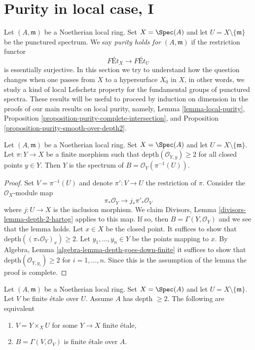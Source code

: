 \section{Purity in local case, I}
\label{section-local-purity}

\noindent
Let $(A, \mathfrak m)$ be a Noetherian local ring. Set $X = \Spec(A)$
and let $U = X \setminus \{\mathfrak m\}$ be the punctured spectrum.
We say {\it purity holds for $(A, \mathfrak m)$} if the restriction functor
$$
\textit{F\'Et}_X \longrightarrow \textit{F\'Et}_U
$$
is essentially surjective. In this section we try to understand how the
question changes when one passes from $X$ to a hypersurface $X_0$ in $X$,
in other words, we study a kind of local Lefschetz property for the
fundamental groups of punctured spectra.
These results will be useful to proceed by induction on dimension
in the proofs of our main results on local purity, namely,
Lemma \ref{lemma-local-purity},
Proposition \ref{proposition-purity-complete-intersection}, and
Proposition \ref{proposition-purity-smooth-over-depth2}.

\begin{lemma}
\label{lemma-sections-over-punctured-spec}
Let $(A, \mathfrak m)$ be a Noetherian local ring. Set $X = \Spec(A)$
and let $U = X \setminus \{\mathfrak m\}$.
Let $\pi : Y \to X$ be a finite morphism such that
$\text{depth}(\mathcal{O}_{Y, y}) \geq 2$ for all closed points
$y \in Y$.
Then $Y$ is the spectrum of $B = \mathcal{O}_Y(\pi^{-1}(U))$.
\end{lemma}

\begin{proof}
Set $V = \pi^{-1}(U)$ and denote $\pi' : V \to U$ the restriction of $\pi$.
Consider the $\mathcal{O}_X$-module map
$$
\pi_*\mathcal{O}_Y \longrightarrow j_*\pi'_*\mathcal{O}_V
$$
where $j : U \to X$ is the inclusion morphism. We claim
Divisors, Lemma \ref{divisors-lemma-depth-2-hartog}
applies to this map. If so, then $B = \Gamma(Y, \mathcal{O}_Y)$
and we see that the lemma holds. Let $x \in X$ be the closed point.
It suffices to show that
$\text{depth}((\pi_*\mathcal{O}_Y)_x) \geq 2$.
Let $y_1, \ldots, y_n \in Y$ be the points mapping to $x$.
By Algebra, Lemma \ref{algebra-lemma-depth-goes-down-finite}
it suffices to show that
$\text{depth}(\mathcal{O}_{Y, y_i}) \geq 2$ for $i = 1, \ldots, n$.
Since this is the assumption of the lemma the proof is complete.
\end{proof}

\begin{lemma}
\label{lemma-reformulate-purity}
Let $(A, \mathfrak m)$ be a Noetherian local ring. Set $X = \Spec(A)$
and let $U = X \setminus \{\mathfrak m\}$.
Let $V$ be finite \'etale
over $U$. Assume $A$ has depth $\geq 2$. The following are equivalent
\begin{enumerate}
\item $V = Y \times_X U$ for some $Y \to X$ finite \'etale,
\item $B = \Gamma(V, \mathcal{O}_V)$ is finite \'etale over $A$.
\end{enumerate}
\end{lemma}

